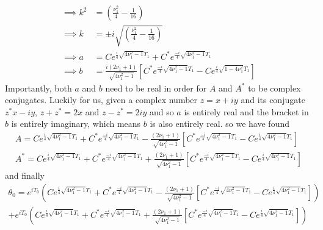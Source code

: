 \documentclass[12pt]{article}
\begin{document}
\begin{enumerate}
\begin{enumerate}
\begin{equation*}
                \begin{split}
                    \implies k^2 &= (\frac{\nu_1^2}{4}-\frac{1}{16}) \\
                    \implies k &= \pm i\sqrt{(\frac{\nu_1^2}{4}-\frac{1}{16})} \\
                    \implies a &= C e^{\frac{i}{4}\sqrt{4\nu_1^2-1}T_1} + C^* e^{\frac{-i}{4}\sqrt{4\nu_1^2-1}T_1} \\
                    \implies b &= \frac{i(2\nu_1+1)}{\sqrt{4\nu_1^2-1}}\left[C^*e^{\frac{-i}{4}\sqrt{4\nu_1^2-1}T_1}-Ce^{\frac{i}{4}\sqrt{1-4\nu_1^2}T_1}\right]
                \end{split}
            \end{equation*}
            Importantly, both $a$ and $b$ need to be real in order for $A$ and $A^*$ to be complex 
            conjugates. Luckily for us, given a complex number $z=x+iy$ and its conjugate $z^*x-iy$, 
            $z+z^*=2x$ and $z-z^*=2iy$ and so $a$ is entirely real and the bracket in $b$ is entirely 
            imaginary, which means $b$ is also entirely real.
            so we have found
            \begin{equation*}
                \begin{split}
                    A = C e^{\frac{i}{4}\sqrt{4\nu_1^2-1}T_1} + C^* e^{\frac{-i}{4}\sqrt{4\nu_1^2-1}T_1} - \frac{(2\nu_1+1)}{\sqrt{4\nu_1^2-1}}\left[C^*e^{\frac{-i}{4}\sqrt{4\nu_1^2-1}T_1}-Ce^{\frac{i}{4}\sqrt{4\nu_1^2-1}T_1}\right] \\
                    A^* = C e^{\frac{i}{4}\sqrt{4\nu_1^2-1}T_1} + C^* e^{\frac{-i}{4}\sqrt{4\nu_1^2-1}T_1} + \frac{(2\nu_1+1)}{\sqrt{4\nu_1^2-1}}\left[C^*e^{\frac{-i}{4}\sqrt{4\nu_1^2-1}T_1}-Ce^{\frac{i}{4}\sqrt{4\nu_1^2-1}T_1}\right]
                \end{split}
            \end{equation*}
            and finally
            \begin{equation}
                \begin{gathered}
                    \theta_0 = e^{iT_0}\left(C e^{\frac{i}{4}\sqrt{4\nu_1^2-1}T_1} + C^* e^{\frac{-i}{4}\sqrt{4\nu_1^2-1}T_1} - \frac{(2\nu_1+1)}{\sqrt{4\nu_1^2-1}}\left[C^*e^{\frac{-i}{4}\sqrt{4\nu_1^2-1}T_1}-Ce^{\frac{i}{4}\sqrt{4\nu_1^2-1}T_1}\right]\right) \\
                    + e^{iT_0}\left(C e^{\frac{i}{4}\sqrt{4\nu_1^2-1}T_1} + C^* e^{\frac{-i}{4}\sqrt{4\nu_1^2-1}T_1} + \frac{(2\nu_1+1)}{\sqrt{4\nu_1^2-1}}\left[C^*e^{\frac{-i}{4}\sqrt{4\nu_1^2-1}T_1}-Ce^{\frac{i}{4}\sqrt{4\nu_1^2-1}T_1}\right]\right)
                \end{gathered}
                \label{eqn:Leading Term A}
            \end{equation}


\end{enumerate}
\end{enumerate}
\end{document}
